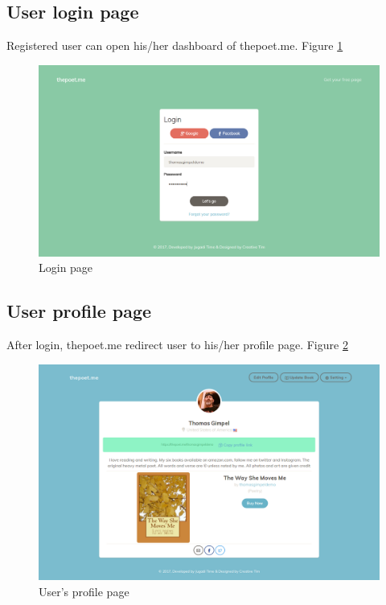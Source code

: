 \subsection{User login page}
Registered user can open his/her dashboard of thepoet.me. Figure \ref{poet3}

\begin{figure}
    \centering \includegraphics[scale=0.35]{images/app/login.png}
    \caption{Login page}
    \label{poet3}
\end{figure}


\subsection{User profile page}
After login, thepoet.me redirect user to his/her profile page. Figure \ref{poet4}

\begin{figure}
    \centering \includegraphics[scale=0.35]{images/app/poetuserprofile-fullpage.png}
    \caption{User's profile page}
    \label{poet4}
\end{figure}

